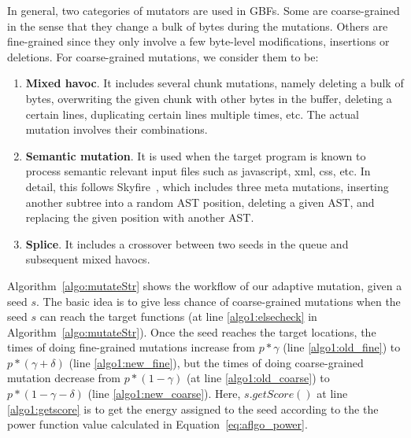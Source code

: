 In general, two categories of mutators are used in GBFs. Some are coarse-grained in the sense that they change a bulk of bytes during the mutations. Others are fine-grained since they only involve a few byte-level modifications, insertions or deletions. For coarse-grained mutations, we consider them to be:
\begin{enumerate}[(1)] 
	\item \textbf{Mixed havoc}. It includes several chunk mutations, namely deleting a bulk of bytes, overwriting the given chunk with other bytes in the buffer, deleting a certain lines, duplicating certain lines multiple times, etc. The actual mutation involves their combinations.
	\item \textbf{Semantic mutation}. It is used when the target program is known to process semantic relevant input files such as javascript, xml, css, etc. In detail, this follows Skyfire~\cite{junjie:2017sp:skyfire}, which includes three meta mutations, inserting another subtree into a random AST position, deleting a given AST, and replacing the given position with another AST.
	\item \textbf{Splice}. It includes a crossover between two seeds in the queue and subsequent mixed havocs.
\end{enumerate}


Algorithm~\ref{algo:mutateStr} shows the workflow of our adaptive mutation, given a seed $s$. 
The basic idea is to give less chance of coarse-grained mutations when the seed $s$ can reach the target functions (at line \ref{algo1:elsecheck} in Algorithm~\ref{algo:mutateStr}). Once the seed reaches the target locations, the times of doing fine-grained mutations increase from  $ p * 	\gamma$ (line \ref{algo1:old_fine}) to $p *(	\gamma + \delta)$ (line \ref{algo1:new_fine}), but the times of doing coarse-grained mutation decrease from  $ p *(1- 	\gamma )$ (at line \ref{algo1:old_coarse}) to $p *(1- 	\gamma -\delta )$ (line \ref{algo1:new_coarse}). Here, $s.getScore()$ at line \ref{algo1:getscore} is to get the energy assigned to the seed according to the the power function value calculated in Equation~\ref{eq:aflgo_power}.

